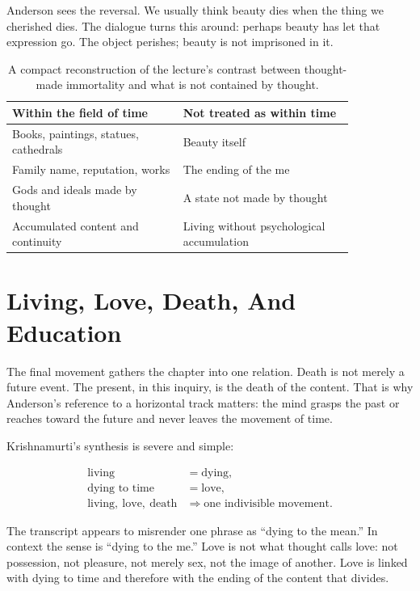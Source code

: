 Anderson sees the reversal. We usually think beauty dies when the thing we cherished dies. The dialogue turns this around: perhaps beauty has let that expression go. The object perishes; beauty is not imprisoned in it.

\begin{table}
\centering
\begin{tabular}{|p{0.42\linewidth}|p{0.42\linewidth}|}
\hline
Within the field of time & Not treated as within time \\
\hline
Books, paintings, statues, cathedrals & Beauty itself \\
\hline
Family name, reputation, works & The ending of the me \\
\hline
Gods and ideals made by thought & A state not made by thought \\
\hline
Accumulated content and continuity & Living without psychological accumulation \\
\hline
\end{tabular}
\caption{A compact reconstruction of the lecture's contrast between thought-made immortality and what is not contained by thought.}
\end{table}

\section{Living, Love, Death, And Education}

The final movement gathers the chapter into one relation. Death is not merely a future event. The present, in this inquiry, is the death of the content. That is why Anderson's reference to a horizontal track matters: the mind grasps the past or reaches toward the future and never leaves the movement of time.

Krishnamurti's synthesis is severe and simple:

\begin{align}
\text{living} &= \text{dying}, \\
\text{dying to time} &= \text{love}, \\
\text{living},\ \text{love},\ \text{death}
&\Rightarrow
\text{one indivisible movement}.
\end{align}

The transcript appears to misrender one phrase as ``dying to the mean.'' In context the sense is ``dying to the me.'' Love is not what thought calls love: not possession, not pleasure, not merely sex, not the image of another. Love is linked with dying to time and therefore with the ending of the content that divides.

